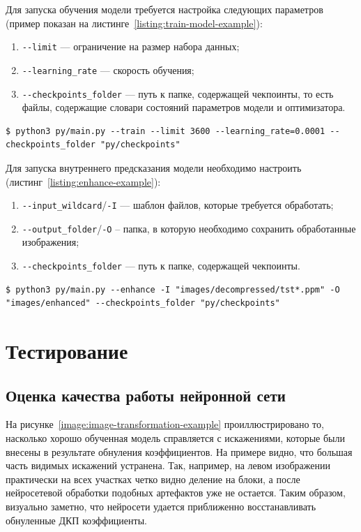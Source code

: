 \documentclass[times,specification,annotation]{itmo-student-thesis}
\begin{document}
Для запуска обучения модели требуется настройка следующих параметров (пример показан на листинге~\ref{listing:train-model-example}):
\begin{enumerate}
    \item \verb|--limit| --- ограничение на размер набора данных;
    \item \verb|--learning_rate| --- скорость обучения;
    \item \verb|--checkpoints_folder| --- путь к папке, содержащей чекпоинты, то есть файлы, содержащие словари состояний параметров модели и оптимизатора.
\end{enumerate}

\begin{lstlisting}[float=!h,caption={Пример запуска обучения модели},label={listing:train-model-example}]
$ python3 py/main.py --train --limit 3600 --learning_rate=0.0001 --checkpoints_folder "py/checkpoints"
\end{lstlisting}

Для запуска внутреннего предсказания модели необходимо настроить (листинг~\ref{listing:enhance-example}):
\begin{enumerate}
    \item \verb|--input_wildcard|/\verb|-I| --- шаблон файлов, которые требуется обработать;
    \item \verb|--output_folder|/\verb|-O| -- папка, в которую необходимо сохранить обработанные изображения;
    \item \verb|--checkpoints_folder| --- путь к папке, содержащей чекпоинты.
\end{enumerate}

\begin{lstlisting}[float=!h,caption={Пример запуска внутреннего предсказания},label={listing:enhance-example}]
$ python3 py/main.py --enhance -I "images/decompressed/tst*.ppm" -O "images/enhanced" --checkpoints_folder "py/checkpoints"
\end{lstlisting}

\section{Тестирование}\label{section:testing}

\subsection{Оценка качества работы нейронной сети}\label{subsection:model-testing}

На рисунке~\ref{image:image-transformation-example} проиллюстрировано то, насколько хорошо обученная модель справляется с искажениями, которые были внесены в результате обнуления коэффициентов. На примере видно, что большая часть видимых искажений устранена. Так, например, на левом изображении практически на всех участках четко видно деление на блоки, а после нейросетевой обработки подобных артефактов уже не остается. Таким образом, визуально заметно, что нейросети удается приближенно восстанавливать обнуленные ДКП коэффициенты.
\end{document}
